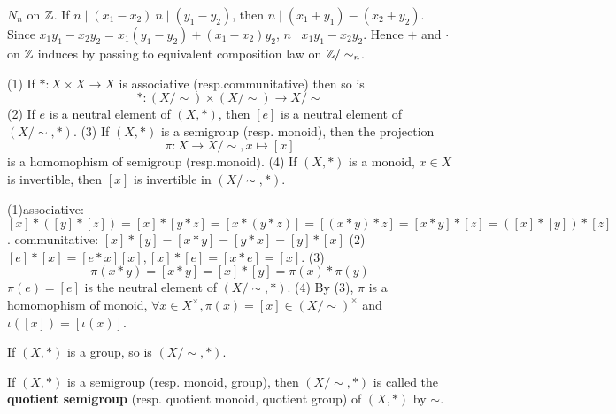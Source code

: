 \documentclass{book}
\numberwithin{equation}{section}
\begin{document}
\begin{exampleenv}
    $N_n$ on $\mathbb{Z}$. 
    \newline
    If $n\mid (x_1-x_2)\ n\mid (y_1-y_2)$, then $n\mid(x_1+y_1)-(x_2+y_2)$.
    \newline
    Since $x_1y_1-x_2y_2=x_1(y_1-y_2)+(x_1-x_2)y_2$, $n\mid x_1y_1-x_2y_2$.
    \newline
    Hence $+$ and $\cdot$ on $\mathbb{Z}$ induces by passing to equivalent composition law on $\mathbb{Z}/\sim_n$.
\end{exampleenv}
\begin{propositionenv}
    \quad\newline
    (1) If $*:X\times X\rightarrow X$ is associative (resp.communitative) then so is $$*:(X/\sim)\times(X/\sim)\rightarrow X/\sim$$
    (2) If $e$ is a neutral element of $(X,*)$, then $[e]$ is a neutral element of $(X/\sim,*)$.
    \newline
    (3) If $(X,*)$ is a semigroup (resp. monoid), then the projection $$\pi:X\rightarrow X/\sim, x\mapsto[x]$$ is a homomophism of  semigroup (resp.monoid).
    \newline
    (4) If $(X,*)$ is a monoid, $x\in X$ is invertible, then $[x]$ is invertible in $(X/\sim,*)$.
\end{propositionenv}
\begin{proofenv}
    \quad
    \newline
    (1)associative:
     $[x]*([y]*[z])=[x]*[y*z]=[x*(y*z)]=[(x*y)*z]=[x*y]*[z]=([x]*[y])*[z]$.
    \newline
    communitative:
    $[x]*[y]=[x*y]=[y*x]=[y]*[x]$
    \newline
    (2) $[e]*[x]=[e*x][x],[x]*[e]=[x*e]=[x]$.
    \newline
    (3) $$\pi(x*y)=[x*y]=[x]*[y]=\pi(x)*\pi(y)$$
    $\pi(e)=[e]$ is the neutral element of $(X/\sim,*)$.
    \newline
    (4) By (3), $\pi$ is a homomophism of monoid, $\forall x \in X^\times, \pi(x)=[x]\in (X/\sim )^\times $ and $\iota([x])=[\iota(x)]$.
\end{proofenv}
\begin{remark}
    If $(X,*)$ is a group, so is $(X/\sim,*)$.
\end{remark}
\begin{definitionenv}
    \quad
    \newline
    If $(X,*)$ is a semigroup (resp. monoid, group), then $(X/\sim, *)$ is called the \textbf{quotient semigroup} (resp. quotient monoid, quotient group) of $(X,*)$ by $\sim$.
\end{definitionenv}
\end{document}
